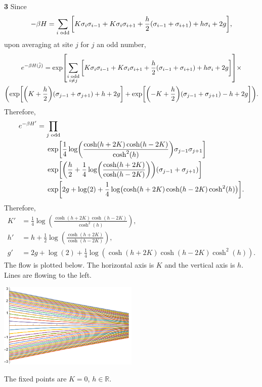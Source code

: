 \documentclass{article}
\makeatletter
\newcommand*{\shifttext}[1]{%
  \settowidth{\@tempdima}{#1}%
  \hspace{-\@tempdima}#1%
}
\newcommand{\plabel}[1]{%
\shifttext{\textbf{#1}\quad}%
}
\newcommand{\prule}{%
\begin{center}%
\hdashrule[0.5ex]{.99\linewidth}{1pt}{1pt 2.5pt}%
\end{center}%
}
\makeatother
\begin{document}
\prule

\plabel{3}%
Since
\[ -\beta H = \sum_{i \text{ odd}} \qty[K \sigma_i \sigma_{i-1} + K \sigma_i \sigma_{i+1} + \frac{h}{2}(\sigma_{i-1} + \sigma_{i+1}) + h\sigma_i + 2g], \]
upon averaging at site $j$ for $j$ an odd number,
\begin{gather*}
    e^{-\beta H(\hat{j})} = \exp[\sum_{\substack{i \text{ odd} \\ i\neq j}} \qty[K \sigma_i \sigma_{i-1} + K \sigma_i \sigma_{i+1} + \frac{h}{2}(\sigma_{i-1} + \sigma_{i+1}) + h\sigma_i + 2g]] \times \\
    \qty(\exp[\qty(K+\frac{h}{2})(\sigma_{j-1} + \sigma_{j+1}) + h + 2g] + \exp[\qty(-K+\frac{h}{2})(\sigma_{j-1} + \sigma_{j+1}) - h + 2g]).
\end{gather*}
Therefore,
\begin{align*}
    e^{-\beta H'} &= \prod_{j \text{ odd}} \\
    &\phantom{{}={}}\exp[\frac{1}{4}\log(\frac{\cosh(h+2K)\cosh(h-2K)}{\cosh^2(h)}) \sigma_{j-1} \sigma_{j+1}] \\
    &\phantom{{}={}} \exp[\qty(\frac{h}{2} + \frac{1}{4}\log(\frac{\cosh(h+2K)}{\cosh(h-2K)}))(\sigma_{j-1}+\sigma_{j+1})] \\
    &\phantom{{}={}} \exp[2g + \log(2) + \frac{1}{4}\log({\cosh(h+2K)\cosh(h-2K)\cosh^2(h)})].
\end{align*}
Therefore,
\begin{align*}
    K' &= \frac{1}{4}\log(\frac{\cosh(h+2K)\cosh(h-2K)}{\cosh^2(h)}), \\
    h' &= h + \frac{1}{2}\log(\frac{\cosh(h+2K)}{\cosh(h-2K)}), \\
    g' &= 2g + \log(2) + \frac{1}{4}\log({\cosh(h+2K)\cosh(h-2K)\cosh^2(h)}).
\end{align*}
The flow is plotted below.
The horizontal axis is $K$ and the vertical axis is $h$.
Lines are flowing to the left.
\begin{center}
    \includegraphics[width=0.5\textwidth]{img/Q3.pdf}
\end{center}
The fixed points are $K=0$, $h\in\mathbb{R}$.
\par
\end{document}
